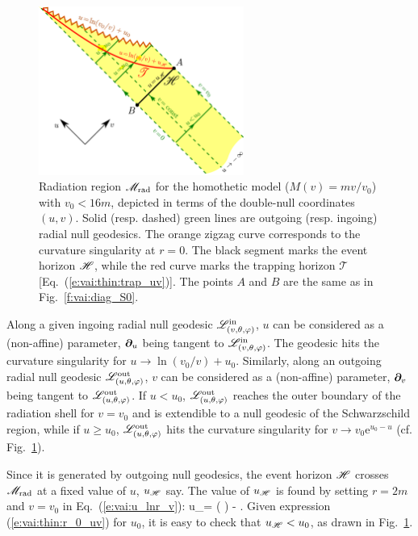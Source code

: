 \begin{figure}
\centerline{\includegraphics[width=0.6\textwidth]{vai_thin_double_null.pdf}}
\caption[]{\label{f:vai:thin_double_null} \footnotesize
Radiation region $\mathscr{M}_{\rm rad}$ for the homothetic model ($M(v) = m v/v_0$) with $v_0 < 16m$,
depicted in terms of the double-null coordinates
$(u, v)$. Solid (resp. dashed) green lines are outgoing (resp. ingoing)
radial null geodesics. The orange zigzag curve corresponds to the curvature
singularity at $r=0$.
The black segment marks the event horizon $\mathscr{H}$, while the red curve marks the trapping horizon
$\mathscr{T}$ [Eq.~(\ref{e:vai:thin:trap_uv})].
The points $A$ and $B$ are the same as in Fig.~\ref{f:vai:diag_S0}.
}
\end{figure}



Along a given ingoing radial null geodesic $\mathscr{L}^{\rm in}_{(v,\theta,\varphi)}$,
$u$ can be considered as a (non-affine) parameter, $\bm{\partial}_u$
being tangent to $\mathscr{L}^{\rm in}_{(v,\theta,\varphi)}$. The geodesic hits the curvature
singularity for $u \to \ln(v_0/v) + u_0$.
Similarly, along an outgoing radial null geodesic $\mathscr{L}^{\rm out}_{(u,\theta,\varphi)}$,
$v$ can be considered as a (non-affine) parameter, $\bm{\partial}_v$
being tangent to $\mathscr{L}^{\rm out}_{(u,\theta,\varphi)}$. If $u < u_0$,
$\mathscr{L}^{\rm out}_{(u,\theta,\varphi)}$ reaches the outer boundary of the radiation
shell for $v=v_0$ and is extendible to a null geodesic of the Schwarzschild
region, while if $u \geq u_0$, $\mathscr{L}^{\rm out}_{(u,\theta,\varphi)}$ hits the
curvature singularity for $v \to v_0 \mathrm{e}^{u_0 - u}$
(cf. Fig.~\ref{f:vai:thin_double_null}).

Since it is generated by outgoing null geodesics,
the event horizon $\mathscr{H}$ crosses $\mathscr{M}_{\rm rad}$ at a fixed value of $u$, $u_{\mathscr{H}}$ say.
The value of $u_{\mathscr{H}}$ is found
by setting $r=2m$ and $v=v_0$ in Eq.~(\ref{e:vai:u_lnr_v}):
\be \label{e:vai:thin:u_H}
    u_\Hor = \arctan\left( \right)
    -  .
\ee
Given expression
(\ref{e:vai:thin:r_0_uv}) for $u_0$, it is easy to check that $u_{\mathscr{H}} < u_0$,
as drawn in Fig.~\ref{f:vai:thin_double_null}.



